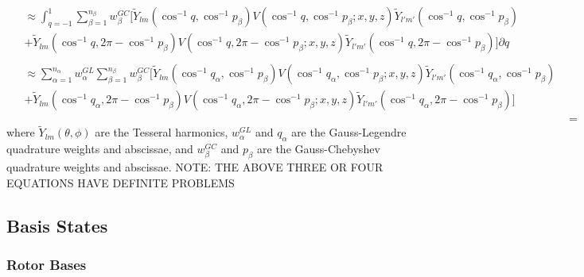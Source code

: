 \documentclass{revtex4-1}
\begin{document}
\begin{align}
											 \begin{split} &\approx\int_{q=-1}^{1}\sum_{\beta=1}^{n_{\beta}}w^{GC}_{\beta}\lbrack\widetilde{Y}_{lm}(\cos^{-1}q, \cos^{-1}p_{\beta})V(\cos^{-1}q, \cos^{-1}p_{\beta}; x,y,z)\widetilde{Y}_{l'm'}(\cos^{-1}q, \cos^{-1}p_{\beta}) \\&+ \widetilde{Y}_{lm}(\cos^{-1}q, 2\pi-\cos^{-1}p_{\beta})V(\cos^{-1}q, 2\pi-\cos^{-1}p_{\beta}; x,y,z)\widetilde{Y}_{l'm'}(\cos^{-1}q, 2\pi-\cos^{-1}p_{\beta})\rbrack \partial q \end{split}\\
											 \begin{split} &\approx\sum_{\alpha=1}^{n_{\alpha}}w^{GL}_{\alpha}\sum_{\beta=1}^{n_{\beta}}w^{GC}_{\beta}\lbrack\widetilde{Y}_{lm}(\cos^{-1}q_{\alpha}, \cos^{-1}p_{\beta})V(\cos^{-1}q_{\alpha}, \cos^{-1}p_{\beta}; x,y,z)\widetilde{Y}_{l'm'}(\cos^{-1}q_{\alpha}, \cos^{-1}p_{\beta}) \\&+ \widetilde{Y}_{lm}(\cos^{-1}q_{\alpha}, 2\pi-\cos^{-1}p_{\beta})V(\cos^{-1}q_{\alpha}, 2\pi-\cos^{-1}p_{\beta}; x,y,z)\widetilde{Y}_{l'm'}(\cos^{-1}q_{\alpha}, 2\pi-\cos^{-1}p_{\beta})\rbrack \end{split}\\
											 &=
\end{align} 
where $\widetilde{Y}_{lm}(\theta,\phi)$ are the Tesseral harmonics, $w^{GL}_{\alpha}$ and $q_{\alpha}$ are the Gauss-Legendre quadrature weights and abscissae, and $w^{GC}_{\beta}$ and $p_{\beta}$ are the Gauss-Chebyshev quadrature weights and abscissae.  NOTE: THE ABOVE THREE OR FOUR EQUATIONS HAVE DEFINITE PROBLEMS

\subsection{Basis States}\label{S:BS}
\subsubsection{Rotor Bases}\label{S:RotBS}
\end{document}
